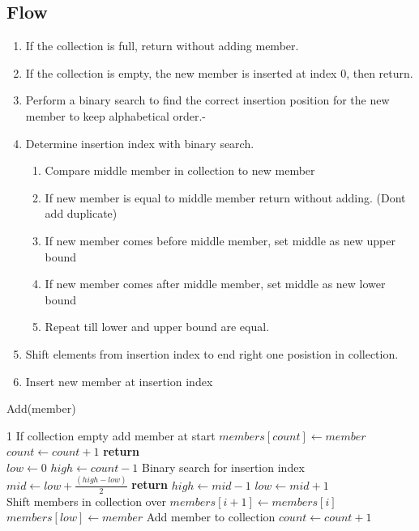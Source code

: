 \documentclass{article}
\begin{document}
\subsection{Flow}
\begin{enumerate}
\item If the collection is full, return without adding member.
\item If the collection is empty, the new member is inserted at index 0, then return.
\item Perform a binary search to find the correct insertion position for the new member to keep alphabetical order.-
\item Determine insertion index with binary search.
\begin{enumerate}
	\item Compare middle member in collection to new member
	\item If new member is equal to middle member return without adding. (Dont add duplicate)
	\item If new member comes before middle member, set middle as new upper bound
	\item If new member comes after middle member, set middle as new lower bound
	\item Repeat till lower and upper bound are equal. 
\end{enumerate}
\item Shift elements from insertion index to end right one posistion in collection.
\item Insert new member at insertion index

\end{enumerate}

\begin{algorithm}[H]
\caption{Add(member)}
\begin{algorithmic}[1]
1     	\Comment If collection empty add member at start
        \State $members[count] \gets member$
        \State $count \gets count + 1$
        \State \textbf{return}
    \EndIf
	\\
    \State $low \gets 0$
    \State $high \gets count - 1$
      \Comment Binary search for insertion index
        \State $mid \gets low + \frac{(high - low)}{2}$
            \State \textbf{return}
            \State $high \gets mid - 1$
            \State $low \gets mid + 1$
        \EndIf
    \EndWhile
	\\
     \Comment Shift members in collection over
        \State $members[i + 1] \gets members[i]$
    \EndFor
    \\
    \State $members[low] \gets member$ \Comment Add member to collection
    \State $count \gets count + 1$
\EndIf
\end{algorithmic}
\end{algorithm}
\end{document}
